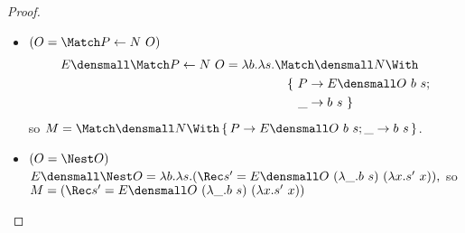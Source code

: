 \begin{proof}
\begin{enumerate}[(a)]
\begin{itemize}
    \item $(O = \Match P \gets N ~ O)$
        \begin{align*}
          & \quad E\den{\Match P \gets N ~ O}
          =
          \lambda b. \lambda s.
          \begin{aligned}[t]
            &\Match \den{N} \With \\
            &\quad
            \begin{aligned}[t]
              \{~
              P &\to E\den{O}~b~s; \\
              \_ &\to b~s
              ~\}
            \end{aligned}
          \end{aligned}
        \end{align*}
        so $M = \Match \den{N} \With \set{P \to E\den{O}~b~s; \_ \to b~s}$.
      \item $(O = \Nest O)$
        \begin{math}
          E\den{\Nest O}
          =
          \lambda b. \lambda s.
          (\Rec s' = E\den{O} ~ (\lambda \_. b ~ s) ~ (\lambda x. s' ~ x))
          ,
        \end{math}
        so $M = (\Rec s' = E\den{O} ~ (\lambda \_. b ~ s) ~ (\lambda x. s' ~ x))$

\end{itemize}
\end{enumerate}
\end{proof}
